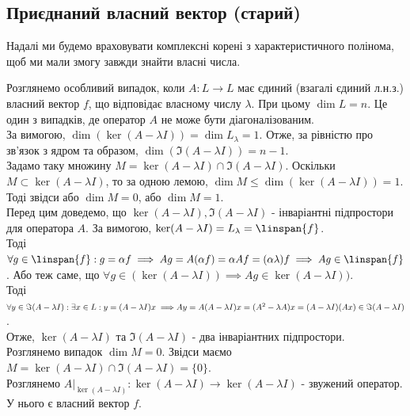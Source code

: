 \iffalse
\subsection{Приєднаний власний вектор (старий)}
\begin{remark}
Надалі ми будемо враховувати комплексні корені з характеристичного полінома, щоб ми мали змогу завжди знайти власні числа.
\end{remark}

\iffalse
Розглянемо особливий випадок, коли $A: L \to L$ має єдиний (взагалі єдиний л.н.з.) власний вектор $f$, що відповідає власному числу $\lambda$. При цьому $\dim L = n$. Це один з випадків, де оператор $A$ не може бути діагоналізованим.\\
За вимогою, $\dim (\ker(A - \lambda I)) = \dim L_{\lambda} = 1$. Отже, за рівністю про зв'язок з ядром та образом, $\dim (\Im (A - \lambda I)) = n-1$.\\
Задамо таку множину $M=\ker(A-\lambda I) \cap \Im(A-\lambda I)$. Оскільки $M \subset \ker (A-\lambda I)$, то за одною лемою, $\dim M \leq \dim(\ker (A-\lambda I)) = 1$.
Тоді звідси або $\dim M = 0$, або $\dim M = 1$.
\bigskip \\
Перед цим доведемо, що $\ker(A - \lambda I), \Im(A-\lambda I)$ - інваріантні підпростори для оператора $A$. За вимогою, $\ker(A-\lambda I) = L_{\lambda} = \linspan\{f\}$.\\
Тоді $\forall g \in \linspan\{f\}: g = \alpha f \implies Ag = A(\alpha f) = \alpha Af = (\alpha \lambda) f \implies Ag \in \linspan\{f\}$. Або теж саме, що $\forall g \in (\ker(A - \lambda I)) \implies Ag \in  \ker(A - \lambda I))$.
\bigskip \\
Тоді $\forall y \in \Im(A-\lambda I): \exists x \in L: y = (A-\lambda I)x \implies \\ Ay = A(A-\lambda I)x = (A^2-\lambda A)x = (A-\lambda I)(Ax) \in \Im(A-\lambda I)$.\\
Отже, $\ker(A-\lambda I)$ та $\Im(A-\lambda I)$ - два інваріантних підпростори.
\bigskip \\
Розглянемо випадок $\dim M = 0$. Звідси маємо $M = \ker(A-\lambda I) \cap \Im(A-\lambda I) = \{0\}$.\\
Розглянемо $A |_{\ker(A-\lambda I)}: \ker(A-\lambda I) \to \ker(A-\lambda I)$ - звужений оператор. У нього є власний вектор $f$.\\
